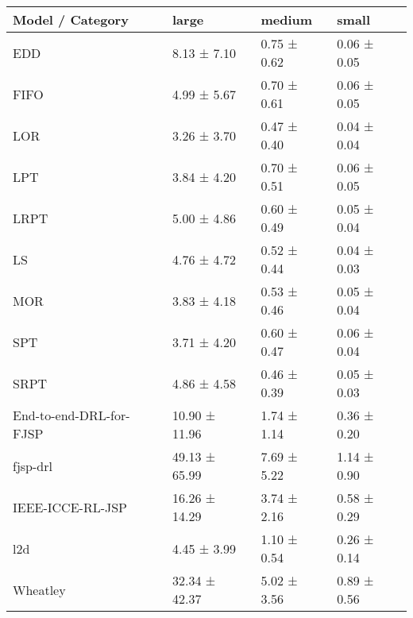 \begin{tabular}{llll}
    \toprule
    Model / Category & large & medium & small \\
    \midrule
    EDD & 8.13 ± 7.10 & 0.75 ± 0.62 & 0.06 ± 0.05 \\
    FIFO & 4.99 ± 5.67 & 0.70 ± 0.61 & 0.06 ± 0.05 \\
    LOR & 3.26 ± 3.70 & 0.47 ± 0.40 & 0.04 ± 0.04 \\
    LPT & 3.84 ± 4.20 & 0.70 ± 0.51 & 0.06 ± 0.05 \\
    LRPT & 5.00 ± 4.86 & 0.60 ± 0.49 & 0.05 ± 0.04 \\
    LS & 4.76 ± 4.72 & 0.52 ± 0.44 & 0.04 ± 0.03 \\
    MOR & 3.83 ± 4.18 & 0.53 ± 0.46 & 0.05 ± 0.04 \\
    SPT & 3.71 ± 4.20 & 0.60 ± 0.47 & 0.06 ± 0.04 \\
    SRPT & 4.86 ± 4.58 & 0.46 ± 0.39 & 0.05 ± 0.03 \\
    End-to-end-DRL-for-FJSP & 10.90 ± 11.96 & 1.74 ± 1.14 & 0.36 ± 0.20 \\
    fjsp-drl & 49.13 ± 65.99 & 7.69 ± 5.22 & 1.14 ± 0.90 \\
    IEEE-ICCE-RL-JSP & 16.26 ± 14.29 & 3.74 ± 2.16 & 0.58 ± 0.29 \\
    l2d & 4.45 ± 3.99 & 1.10 ± 0.54 & 0.26 ± 0.14 \\
    Wheatley & 32.34 ± 42.37 & 5.02 ± 3.56 & 0.89 ± 0.56 \\
    \bottomrule
\end{tabular}
    
